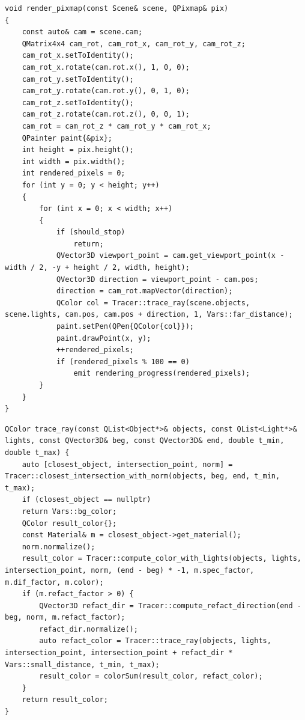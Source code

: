 \begin{lstlisting}[label=lst:render_pixmap,caption=Функция отрисовки сцены на изображении]
void render_pixmap(const Scene& scene, QPixmap& pix)
{
	const auto& cam = scene.cam;
	QMatrix4x4 cam_rot, cam_rot_x, cam_rot_y, cam_rot_z;
	cam_rot_x.setToIdentity();
	cam_rot_x.rotate(cam.rot.x(), 1, 0, 0);
	cam_rot_y.setToIdentity();
	cam_rot_y.rotate(cam.rot.y(), 0, 1, 0);
	cam_rot_z.setToIdentity();
	cam_rot_z.rotate(cam.rot.z(), 0, 0, 1);
	cam_rot = cam_rot_z * cam_rot_y * cam_rot_x;
	QPainter paint{&pix};
	int height = pix.height();
	int width = pix.width();
	int rendered_pixels = 0;
	for (int y = 0; y < height; y++)
	{
		for (int x = 0; x < width; x++)
		{
			if (should_stop)
				return;
			QVector3D viewport_point = cam.get_viewport_point(x - width / 2, -y + height / 2, width, height);
			QVector3D direction = viewport_point - cam.pos;
			direction = cam_rot.mapVector(direction);		
			QColor col = Tracer::trace_ray(scene.objects, scene.lights, cam.pos, cam.pos + direction, 1, Vars::far_distance);
			paint.setPen(QPen{QColor{col}});
			paint.drawPoint(x, y);
			++rendered_pixels;
			if (rendered_pixels % 100 == 0)
				emit rendering_progress(rendered_pixels);
		}
	}
}
\end{lstlisting}


\begin{lstlisting}[label=lst:trace_ray,caption=Функция испускания луча]
QColor trace_ray(const QList<Object*>& objects, const QList<Light*>& lights, const QVector3D& beg, const QVector3D& end, double t_min, double t_max) {
	auto [closest_object, intersection_point, norm] = Tracer::closest_intersection_with_norm(objects, beg, end, t_min, t_max);
	if (closest_object == nullptr)
	return Vars::bg_color;
	QColor result_color{};
	const Material& m = closest_object->get_material();
	norm.normalize();
	result_color = Tracer::compute_color_with_lights(objects, lights, intersection_point, norm, (end - beg) * -1, m.spec_factor, m.dif_factor, m.color);
	if (m.refact_factor > 0) {
		QVector3D refact_dir = Tracer::compute_refact_direction(end - beg, norm, m.refact_factor);
		refact_dir.normalize();
		auto refact_color = Tracer::trace_ray(objects, lights, intersection_point, intersection_point + refact_dir * Vars::small_distance, t_min, t_max);
		result_color = colorSum(result_color, refact_color);
	}
	return result_color;
}
\end{lstlisting}


